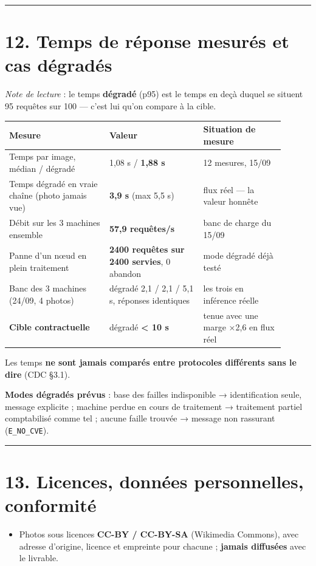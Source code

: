 \documentclass[11pt,a4paper]{article}
\newcommand{\fait}{\textcolor{green!45!black}{\ding{51}}}      %
\begin{document}
\medskip\hrule\medskip
\section*{12. Temps de réponse mesurés et cas dégradés}
\textit{Note de lecture} : le temps \textbf{dégradé} (p95) est le temps en deçà duquel se situent 95 requêtes sur 100 — c'est lui qu'on compare à la cible.

\sloppy
\begin{longtable}{|p{0.321\linewidth}|p{0.308\linewidth}|p{0.268\linewidth}|}
\hline
\textbf{Mesure} & \textbf{Valeur} & \textbf{Situation de mesure} \\ \hline
\endhead
Temps par image, médian / dégradé & 1,08 s / \textbf{1,88 s} & 12 mesures, 15/09 \\ \hline
Temps dégradé en vraie chaîne (photo jamais vue) & \textbf{3,9 s} (max 5,5 s) & flux réel — la valeur honnête \\ \hline
Débit sur les 3 machines ensemble & \textbf{57,9 requêtes/s} & banc de charge du 15/09 \\ \hline
Panne d'un nœud en plein traitement & \textbf{2400 requêtes sur 2400 servies}, 0 abandon & mode dégradé déjà testé \\ \hline
Banc des 3 machines (24/09, 4 photos) & dégradé 2,1 / 2,1 / 5,1 s, réponses identiques & les trois en inférence réelle \\ \hline
\textbf{Cible contractuelle} & dégradé \textbf{< 10 s} & \fait tenue avec une marge ×2,6 en flux réel \\ \hline
\end{longtable}
Les temps \textbf{ne sont jamais comparés entre protocoles différents sans le dire} (CDC §3.1).

\textbf{Modes dégradés prévus} : base des failles indisponible → identification seule, message explicite ; machine perdue en cours de traitement → traitement partiel comptabilisé comme tel ; aucune faille trouvée → message non rassurant (\texttt{E\_\allowbreak{}NO\_\allowbreak{}CVE}).

\medskip\hrule\medskip
\section*{13. Licences, données personnelles, conformité}
\begin{itemize}  \item Photos sous licences \textbf{CC-BY / CC-BY-SA} (Wikimedia Commons), avec adresse d'origine, licence et empreinte pour chacune ; \textbf{jamais diffusées} avec le livrable.
\end{itemize}
\end{document}
